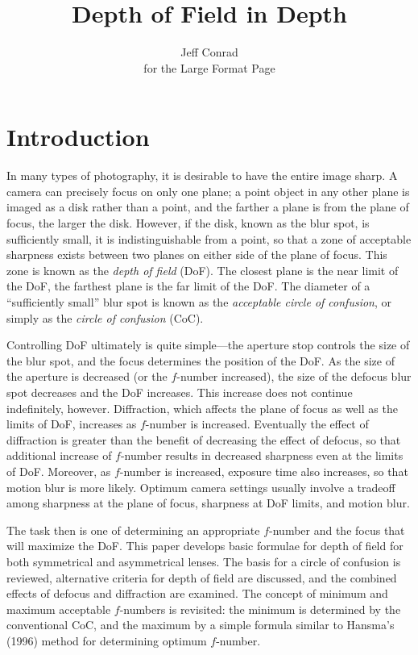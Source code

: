 \documentclass[11pt, oneside]{scrartcl}   	%
\title{Depth of Field in Depth}
\author{Jeff Conrad\\for the Large Format Page}
\begin{document}
\maketitle
\section{Introduction}


  In many types of photography, it is desirable to have the entire image sharp. A camera can precisely focus on only one plane; a point object in any other plane is imaged as a disk rather than a point, and the farther a plane is from the plane of focus, the larger the disk. However, if the disk, known as the blur spot, is sufficiently small, it is indistinguishable from a point, so that a zone of acceptable sharpness exists between two planes on either side of the plane of focus. This zone is known as the \emph{depth of field} (DoF). The closest plane is the near limit of the DoF, the farthest plane is the far limit of the DoF. The diameter of a “sufficiently small” blur spot is known as the \emph{acceptable circle of confusion}, or simply as the \emph{circle of confusion} (CoC).
  
  
Controlling DoF ultimately is quite simple---the aperture stop controls the size of the blur spot, and the focus determines the position of the DoF. As the size of the aperture is decreased (or the $f$-number increased), the size of the defocus blur spot decreases and the DoF increases. This increase does not continue indefinitely, however. Diffraction, which affects the plane of focus as well as the limits of DoF, increases as $f$-number is increased. Eventually the effect of diffraction is greater than the benefit of decreasing the effect of defocus, so that additional increase of $f$-number results in decreased sharpness even at the limits of DoF. Moreover, as $f$-number is increased, exposure time also increases, so that motion blur is more likely. Optimum camera settings usually involve a tradeoff among sharpness at the plane of focus, sharpness at DoF limits, and motion blur.

The task then is one of determining an appropriate $f$-number and the focus that will maximize the DoF. This paper develops basic formulae for depth of field for both symmetrical and asymmetrical lenses. The basis for a circle of confusion is reviewed, alternative criteria for depth of field are discussed, and the combined effects of defocus and diffraction are examined. The concept of minimum and maximum acceptable $f$-numbers is revisited: the minimum is determined by the conventional CoC, and the maximum by a simple formula similar to Hansma’s (1996) method for determining optimum $f$-number.
\end{document}
